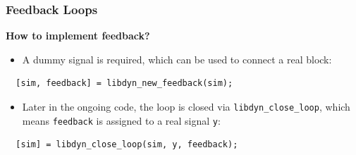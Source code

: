 \documentclass[serif,9pt,xcolor=dvipsnames]{beamer}
\begin{document}
\begin{frame}[fragile]
 \frametitle{Feedback Loops}

\textbf{How to implement feedback?}

  \begin{itemize}
   \item A dummy signal is required, which can be used to connect a real block:
  \end{itemize}

  {\small 
  \begin{lstlisting} 
  [sim, feedback] = libdyn_new_feedback(sim);
  \end{lstlisting}}

  \begin{itemize}
   \item Later in the ongoing code, the loop is closed via \texttt{libdyn\_close\_loop}, which means \texttt{feedback} is assigned to a real signal \texttt{y}:
  \end{itemize}

  {\small 
  \begin{lstlisting} 
  [sim] = libdyn_close_loop(sim, y, feedback);
  \end{lstlisting}}
  
\end{frame}
\end{document}
